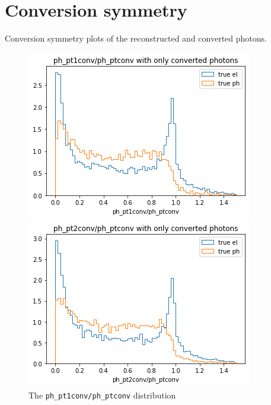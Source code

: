 \documentclass[a4paper, oneside]{book}
\begin{document}
	\chapter{Conversion symmetry} \label{Appex: sym}
		Conversion symmetry plots of the reconstructed and converted photons. %
		\begin{figure}[H]  
			\begin{minipage}[b]{0.5\linewidth}
				\centering
				\includegraphics[width=.9\linewidth]{tesi_images/pt1_pt.png} 
				\caption{The \texttt{ph\_pt1conv/ph\_ptconv} distribution} 
				\label{fig: pt1/pt}
				\vspace{4ex}
			\end{minipage}%
			\begin{minipage}[b]{0.5\linewidth}
				\centering
				\includegraphics[width=.9\linewidth]{tesi_images/pt2_pt.png} 

\end{minipage}
\end{figure}
\end{document}
